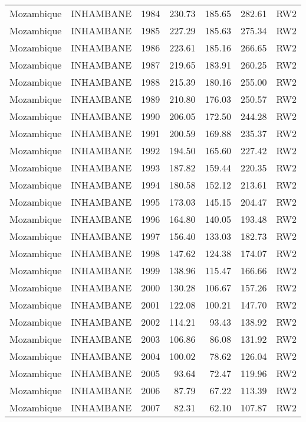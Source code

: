 \begin{longtable}{lllrrrl}
  Mozambique & INHAMBANE & 1984 & 230.73 & 185.65 & 282.61 & RW2 \\ 
  Mozambique & INHAMBANE & 1985 & 227.29 & 185.63 & 275.34 & RW2 \\ 
  Mozambique & INHAMBANE & 1986 & 223.61 & 185.16 & 266.65 & RW2 \\ 
  Mozambique & INHAMBANE & 1987 & 219.65 & 183.91 & 260.25 & RW2 \\ 
  Mozambique & INHAMBANE & 1988 & 215.39 & 180.16 & 255.00 & RW2 \\ 
  Mozambique & INHAMBANE & 1989 & 210.80 & 176.03 & 250.57 & RW2 \\ 
  Mozambique & INHAMBANE & 1990 & 206.05 & 172.50 & 244.28 & RW2 \\ 
  Mozambique & INHAMBANE & 1991 & 200.59 & 169.88 & 235.37 & RW2 \\ 
  Mozambique & INHAMBANE & 1992 & 194.50 & 165.60 & 227.42 & RW2 \\ 
  Mozambique & INHAMBANE & 1993 & 187.82 & 159.44 & 220.35 & RW2 \\ 
  Mozambique & INHAMBANE & 1994 & 180.58 & 152.12 & 213.61 & RW2 \\ 
  Mozambique & INHAMBANE & 1995 & 173.03 & 145.15 & 204.47 & RW2 \\ 
  Mozambique & INHAMBANE & 1996 & 164.80 & 140.05 & 193.48 & RW2 \\ 
  Mozambique & INHAMBANE & 1997 & 156.40 & 133.03 & 182.73 & RW2 \\ 
  Mozambique & INHAMBANE & 1998 & 147.62 & 124.38 & 174.07 & RW2 \\ 
  Mozambique & INHAMBANE & 1999 & 138.96 & 115.47 & 166.66 & RW2 \\ 
  Mozambique & INHAMBANE & 2000 & 130.28 & 106.67 & 157.26 & RW2 \\ 
  Mozambique & INHAMBANE & 2001 & 122.08 & 100.21 & 147.70 & RW2 \\ 
  Mozambique & INHAMBANE & 2002 & 114.21 & 93.43 & 138.92 & RW2 \\ 
  Mozambique & INHAMBANE & 2003 & 106.86 & 86.08 & 131.92 & RW2 \\ 
  Mozambique & INHAMBANE & 2004 & 100.02 & 78.62 & 126.04 & RW2 \\ 
  Mozambique & INHAMBANE & 2005 & 93.64 & 72.47 & 119.96 & RW2 \\ 
  Mozambique & INHAMBANE & 2006 & 87.79 & 67.22 & 113.39 & RW2 \\ 
  Mozambique & INHAMBANE & 2007 & 82.31 & 62.10 & 107.87 & RW2 \\ 

\end{longtable}

